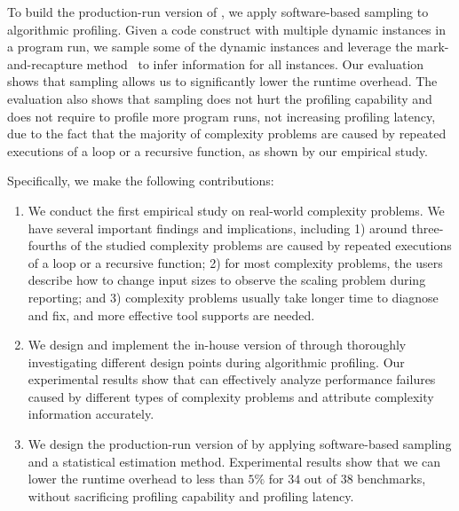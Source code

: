 To build the production-run version of \Tool,
we apply software-based sampling to algorithmic profiling.
Given a code construct with multiple dynamic instances in a program run,
we sample some of the dynamic instances and leverage the mark-and-recapture 
method~\citep{mark-recapture} to infer information for all instances. 
Our evaluation shows that 
sampling allows us to significantly lower the runtime overhead.
The evaluation also shows that sampling does not hurt the profiling capability 
and does not require to profile more program runs, 
not increasing profiling latency, due to the fact that
the majority of complexity problems are caused by 
repeated executions of a loop or a recursive function, as shown by our empirical study.



Specifically, we make the following contributions:

\begin{enumerate}

\item We conduct the first empirical study on real-world complexity problems. 
We have several important findings and implications, including
1) around three-fourths of the studied complexity problems are 
caused by repeated executions of a loop or a recursive function;
2) for most complexity problems, 
the users describe how to change input sizes to observe the scaling problem during reporting;
and 3) complexity problems usually take longer time to diagnose and fix, 
and more effective tool supports are needed.  

\item We design and implement the in-house version of \Tool through 
thoroughly investigating different design points during algorithmic profiling. 
Our experimental results show that \Tool can effectively analyze performance failures 
caused by different types of complexity problems and attribute complexity information accurately.  

\item We design the production-run version of \Tool by applying 
software-based sampling and a statistical estimation method. 
Experimental results show that we can lower the runtime overhead to less than 
$5\%$ for $34$ out of $38$ benchmarks, 
without sacrificing profiling capability and profiling latency.  

\end{enumerate}

